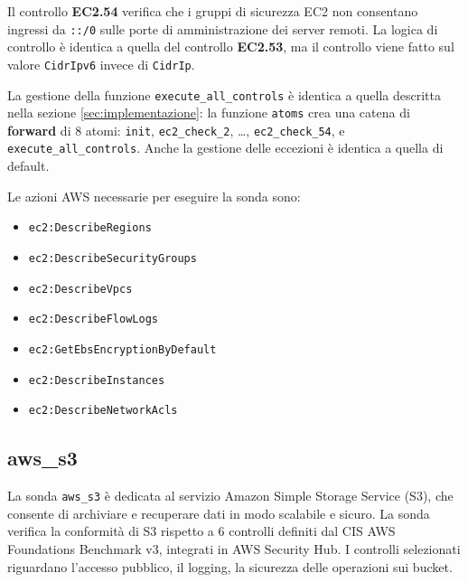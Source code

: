 Il controllo \textbf{EC2.54} verifica che i gruppi di sicurezza EC2 non consentano ingressi da \texttt{::/0} sulle porte di amministrazione dei server remoti. La logica di controllo è identica a quella del controllo \textbf{EC2.53}, ma il controllo viene fatto sul valore \texttt{CidrIpv6} invece di \texttt{CidrIp}. 

La gestione della funzione \texttt{execute\_all\_controls} è identica a quella descritta nella sezione \ref{sec:implementazione}: la funzione \texttt{atoms} crea una catena di \textbf{forward} di 8 atomi: \texttt{init}, \texttt{ec2\_check\_2}, \dots, \texttt{ec2\_check\_54}, e \texttt{execute\_all\_controls}. Anche la gestione delle eccezioni è identica a quella di default.

Le azioni AWS necessarie per eseguire la sonda sono:

\begin{itemize}
    \item \texttt{ec2:DescribeRegions}
    \item \texttt{ec2:DescribeSecurityGroups}
    \item \texttt{ec2:DescribeVpcs}
    \item \texttt{ec2:DescribeFlowLogs}
    \item \texttt{ec2:GetEbsEncryptionByDefault}
    \item \texttt{ec2:DescribeInstances}
    \item \texttt{ec2:DescribeNetworkAcls}
\end{itemize}

\subsection{aws\_s3}
\label{sec:s3}

La sonda \texttt{aws\_s3} è dedicata al servizio Amazon Simple Storage Service (S3), che consente di archiviare e recuperare dati in modo scalabile e sicuro. La sonda verifica la conformità di S3 rispetto a 6 controlli definiti dal CIS AWS Foundations Benchmark v3, integrati in AWS Security Hub. I controlli selezionati riguardano l'accesso pubblico, il logging, la sicurezza delle operazioni sui bucket.

